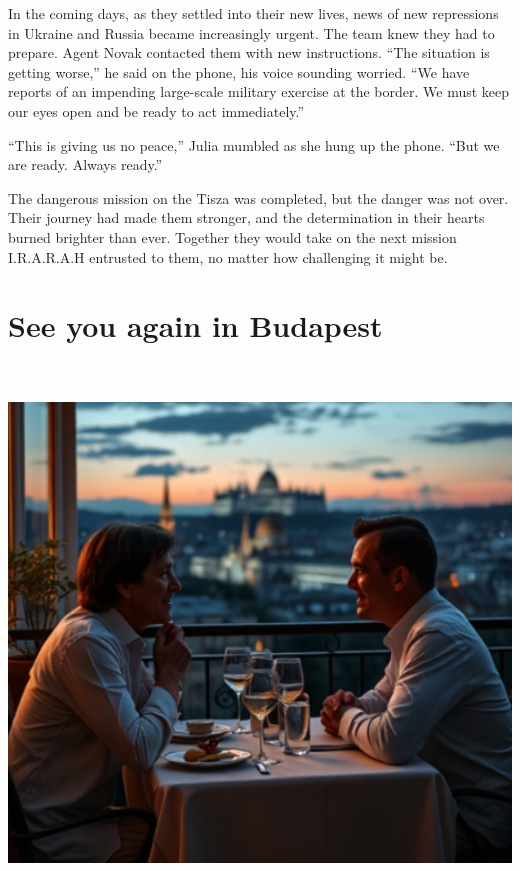 \documentclass[
]{article}
\begin{document}
In the coming days, as they settled into their new lives, news of new
repressions in Ukraine and Russia became increasingly urgent. The team
knew they had to prepare. Agent Novak contacted them with new
instructions. ``The situation is getting worse,'' he said on the phone,
his voice sounding worried. ``We have reports of an impending
large-scale military exercise at the border. We must keep our eyes open
and be ready to act immediately.''

``This is giving us no peace,'' Julia mumbled as she hung up the phone.
``But we are ready. Always ready.''

The dangerous mission on the Tisza was completed, but the danger was not
over. Their journey had made them stronger, and the determination in
their hearts burned brighter than ever. Together they would take on the
next mission I.R.A.R.A.H entrusted to them, no matter how challenging it
might be.

\section{See you again in Budapest}\label{see-you-again-in-budapest}

\includegraphics[width=6in,height=5.58333in]{media/image008.png}
\end{document}
